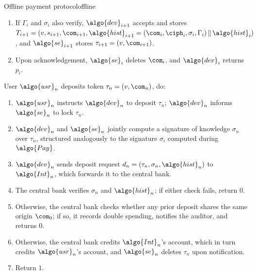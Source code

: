 \begin{protocolbox}{Offline payment protocol}{offline}
\begin{description}
\begin{enumerate}
      \item If $\Gamma_i$ and $\sigma_i$ also verify, $\algo{dev}_{i+1}$
        accepts and stores $T_{i+1} = (v, s_{i+1}, \com_{i+1},
        \algo{hist}_{i+1} = (\com_i, \ciph_i, \sigma_i, \Gamma_i) \, \| \,
        \algo{hist}_i)$, and $\algo{se}_{i+1}$ stores $\tau_{i+1} = (v,
        \com_{i+1})$.

      \item Upon acknowledgement, $\algo{se}_i$ deletes $\com_i$, and
        $\algo{dev}_i$ returns $p_i$.

    \end{enumerate}

  \item[$\{0,1\} \leftarrow \algo{Deposit}(\tau_n, \algo{hist}_n)$
    :]\label{sec:deposit} User $\algo{usr}_n$ deposits token $\tau_n = (v,
    \com_n)$, do:

    \begin{enumerate}

      \item $\algo{usr}_n$ instructs $\algo{dev}_n$ to deposit $\tau_n$;
        $\algo{dev}_n$ informs $\algo{se}_n$ to lock $\tau_n$.

      \item $\algo{dev}_n$ and $\algo{se}_n$ jointly compute a signature of
        knowledge $\sigma_n$ over $\tau_n$, structured analogously to the
        signature $\sigma_i$ computed during $\algo{Pay}$.

      \item $\algo{dev}_n$ sends deposit request $d_n = (\tau_n, \sigma_n,
        \algo{hist}_n)$ to $\algo{Int}_n$, which forwards it to the central
        bank.

      \item The central bank verifies $\sigma_n$ and $\algo{hist}_n$; if either
        check fails, return $0$.

      \item Otherwise, the central bank checks whether any prior deposit shares
        the same origin $\com_0$; if so, it records double spending, notifies
        the auditor, and returns $0$.

      \item Otherwise, the central bank credits $\algo{Int}_n$'s account, which
        in turn credits $\algo{usr}_n$'s account, and $\algo{se}_n$ deletes
        $\tau_n$ upon notification.

      \item Return $1$.


\end{enumerate}
\end{description}
\end{protocolbox}
